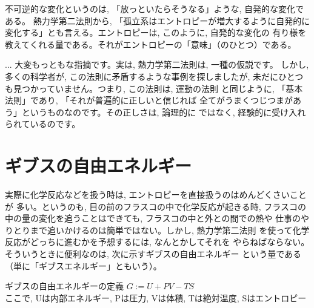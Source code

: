 不可逆的な変化というのは, 「放っといたらそうなる」ような, 自発的な変化である。
熱力学第二法則から, 「孤立系はエントロピーが増大するように自発的に
変化する」とも言える。エントロピーは, このように, 自発的な変化の
有り様を教えてくれる量である。それがエントロピーの「意味」（のひとつ）である。

\begin{faq}{\small{}
 ... 大変もっともな指摘です。実は, 熱力学第二法則は, 一種の仮説です。
しかし, 多くの科学者が, この法則に矛盾するような事例を探しましたが, 
未だにひとつも見つかっていません。つまり, この法則は, 運動の法則
と同じように, 「基本法則」であり, 「それが普遍的に正しいと信じれば
全てがうまくつじつまがあう」というものなのです。その正しさは, 論理的に
ではなく, 経験的に受け入れられているのです。}\end{faq}\mv



\section{ギブスの自由エネルギー}

実際に化学反応などを扱う時は, エントロピーを直接扱うのはめんどくさいことが
多い。というのも, 目の前のフラスコの中で化学反応が起きる時, フラスコの
中の量の変化を追うことはできても, フラスコの中と外との間での熱や
仕事のやりとりまで追いかけるのは簡単ではない。しかし, 熱力学第二法則
を使って化学反応がどっちに進むかを予想するには, なんとかしてそれを
やらねばならない。そういうときに便利なのは, 次に示すギブスの自由エネルギー
という量である
（単に「ギブスエネルギー」ともいう）。
\begin{itembox}{ギブスの自由エネルギーの定義}
$G:=U+PV-TS$\\
ここで, Uは内部エネルギー, Pは圧力, Vは体積, Tは絶対温度, Sはエントロピー
\end{itembox}

